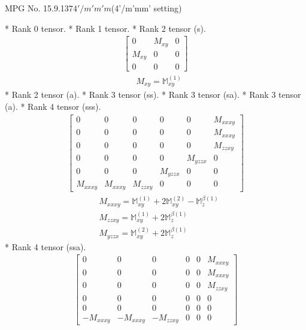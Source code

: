 \documentclass[fleqn,8pt,landscape]{jsarticle}
\begin{document}
\setcounter{MaxMatrixCols}{32}

\renewcommand{\tablename}{Table~}
\renewcommand{\figurename}{Figure~}
\begin{center}
\LARGE
MPG No. 15.9.137\quad$4'/m'm'm$\quad(4'/m'mm' setting)
\end{center}
* Rank 0 tensor.
* Rank 1 tensor.
* Rank 2 tensor (s).
\begin{align*}
\begin{bmatrix} 0 & M_{xy} & 0 \\ M_{xy} & 0 & 0 \\ 0 & 0 & 0 \end{bmatrix}
\end{align*}
\begin{align*}
& M_{xy} = \mathbb{M}_{xy}^{(1)}
\end{align*}
* Rank 2 tensor (a).
* Rank 3 tensor (ss).
* Rank 3 tensor (sa).
* Rank 3 tensor (a).
* Rank 4 tensor (sss).
\begin{align*}
\begin{bmatrix} 0 & 0 & 0 & 0 & 0 & M_{xxxy} \\ 0 & 0 & 0 & 0 & 0 & M_{xxxy} \\ 0 & 0 & 0 & 0 & 0 & M_{zzxy} \\ 0 & 0 & 0 & 0 & M_{yzzx} & 0 \\ 0 & 0 & 0 & M_{yzzx} & 0 & 0 \\ M_{xxxy} & M_{xxxy} & M_{zzxy} & 0 & 0 & 0 \end{bmatrix}
\end{align*}
\begin{align*}
& M_{xxxy} = \mathbb{M}_{xy}^{(1)} + 2 \mathbb{M}_{xy}^{(2)} - \mathbb{M}_{z}^{\beta(1)} \\
& M_{zzxy} = \mathbb{M}_{xy}^{(1)} + 2 \mathbb{M}_{z}^{\beta(1)} \\
& M_{yzzx} = \mathbb{M}_{xy}^{(2)} + 2 \mathbb{M}_{z}^{\beta(1)}
\end{align*}
* Rank 4 tensor (ssa).
\begin{align*}
\begin{bmatrix} 0 & 0 & 0 & 0 & 0 & M_{xxxy} \\ 0 & 0 & 0 & 0 & 0 & M_{xxxy} \\ 0 & 0 & 0 & 0 & 0 & M_{zzxy} \\ 0 & 0 & 0 & 0 & 0 & 0 \\ 0 & 0 & 0 & 0 & 0 & 0 \\ - M_{xxxy} & - M_{xxxy} & - M_{zzxy} & 0 & 0 & 0 \end{bmatrix}
\end{align*}
\end{document}
